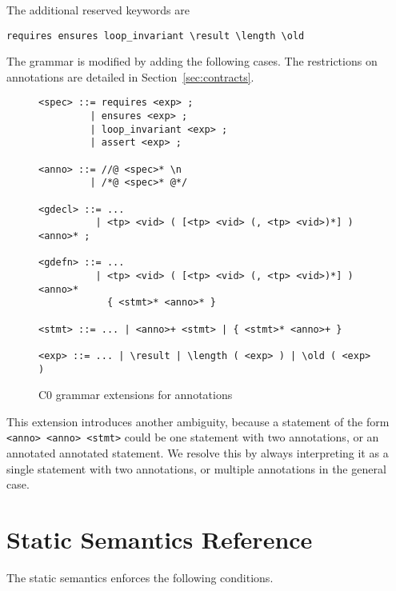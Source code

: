 \documentclass[11pt]{article}
\begin{document}
The additional reserved keywords are
\begin{verbatim}
requires ensures loop_invariant \result \length \old
\end{verbatim}
The grammar is modified by adding the following cases.  The
restrictions on annotations are detailed in
Section~\ref{sec:contracts}.

\begin{figure}
\begin{small}
\begin{verbatim}
<spec> ::= requires <exp> ;
         | ensures <exp> ;
         | loop_invariant <exp> ;
         | assert <exp> ;

<anno> ::= //@ <spec>* \n
         | /*@ <spec>* @*/

<gdecl> ::= ...
          | <tp> <vid> ( [<tp> <vid> (, <tp> <vid>)*] ) <anno>* ;

<gdefn> ::= ...
          | <tp> <vid> ( [<tp> <vid> (, <tp> <vid>)*] ) <anno>*
            { <stmt>* <anno>* }

<stmt> ::= ... | <anno>+ <stmt> | { <stmt>* <anno>+ }

<exp> ::= ... | \result | \length ( <exp> ) | \old ( <exp> )
\end{verbatim}
\end{small}
\caption{C0 grammar extensions for annotations}
\end{figure}

This extension introduces another ambiguity, because a statement of the
form \verb'<anno> <anno> <stmt>' could be one statement with two
annotations, or an annotated annotated statement.  We resolve this by
always interpreting it as a single statement with two annotations, or
multiple annotations in the general case.

\section{Static Semantics Reference}

The static semantics enforces the following conditions.
\end{document}
